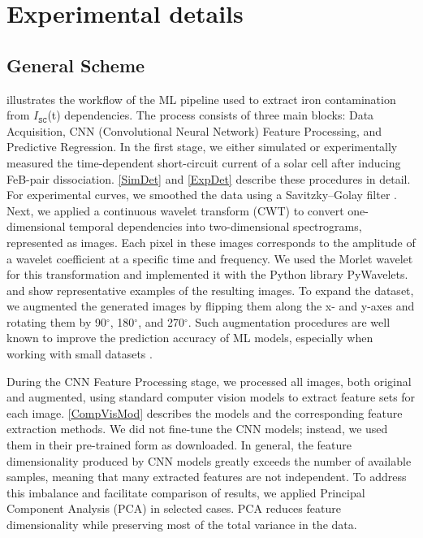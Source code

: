 \documentclass[10pt]{iopart}
\begin{document}
\section{Experimental details}\label{sec:Exp}
\subsection{General Scheme}\label{subsec:GenSch}

 illustrates the workflow of the ML pipeline used to extract iron contamination from $I_\mathtt{SC}$(t) dependencies. 
The process consists of three main blocks: Data Acquisition, CNN (Convolutional Neural Network) Feature Processing, and Predictive Regression.
In the first stage, we either simulated or experimentally measured the time-dependent short-circuit current of a solar cell after inducing FeB-pair dissociation. 
\ref{SimDet} and \ref{ExpDet} describe these procedures in detail. 
For experimental curves, we smoothed the data using a Savitzky–Golay filter \cite{Krishnan2013}.
Next, we applied a continuous wavelet transform (CWT) \cite{Torrence1998} to convert one-dimensional temporal dependencies into two-dimensional spectrograms, represented as images. 
Each pixel in these images corresponds to the amplitude of a wavelet coefficient at a specific time and frequency. 
We used the Morlet wavelet for this transformation and implemented it with the Python library PyWavelets. 
 and  show representative examples of the resulting images.
To expand the dataset, we augmented the generated images by flipping them along the x- and y-axes and rotating them by 90$^{\circ}$, 180$^{\circ}$, and 270$^{\circ}$. 
Such augmentation procedures are well known to improve the prediction accuracy of ML models, especially when working with small datasets \cite{Ahmad2020}.


During the CNN Feature Processing stage, we processed all images, both original and augmented, using standard computer vision models to extract feature sets for each image. 
\ref{CompVisMod} describes the models and the corresponding feature extraction methods. 
We did not fine-tune the CNN models; instead, we used them in their pre-trained form as downloaded.
In general, the feature dimensionality produced by CNN models greatly exceeds the number of available samples, meaning that many extracted features are not independent. 
To address this imbalance and facilitate comparison of results, we applied Principal Component Analysis (PCA) in selected cases. PCA reduces feature dimensionality while preserving most of the total variance in the data.
\end{document}
